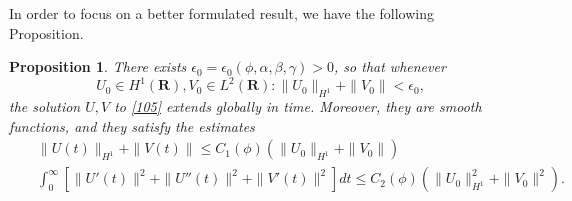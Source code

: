 \documentclass[12pt]{amsart}
\newtheorem{proposition}{Proposition}
\theoremstyle{definition}
\theoremstyle{remark}
\numberwithin{equation}{section}
\renewcommand{\(}{\left(}
\renewcommand{\)}{\right)}
\renewcommand{\[}{\left[}
\renewcommand{\]}{\right]}
\newcommand{\al}{\alpha}
\newcommand{\be}{\beta}
\newcommand{\ga}{\gamma}
\newcommand{\rone}{\mathbf R}
\newcommand{\eps}{\epsilon}
\begin{document}
In order to focus on a better formulated result, we have the following Proposition. 
\begin{proposition}
	\label{prop:65} 
There exists $\eps_0=\eps_0(\phi, \al, \be, \ga)>0$, so that whenever 
\begin{equation}
	\label{297} 
	U_0\in H^1(\rone), V_0\in L^2(\rone):  \|U_0\|_{H^1}+\|V_0\|<\eps_0, 
\end{equation}
the solution $U,V$ to \eqref{105} extends globally in time. Moreover, they are smooth functions, and they satisfy the estimates 
\begin{eqnarray}
	\label{w:10} 
& & 	\|U(t)\|_{H^1}+ \|V(t)\|\leq C_1(\phi) (\|U_0\|_{H^1}+\|V_0\|) \\
		\label{w:20}
	& & 	\int_0^\infty  [\|U'(t)\|^2+ \|U''(t)\|^2+\|V'(t)\|^2]dt\leq C_2(\phi) (\|U_0\|_{H^1}^2+\|V_0\|^2). 
\end{eqnarray}
\end{proposition}
\end{document}

